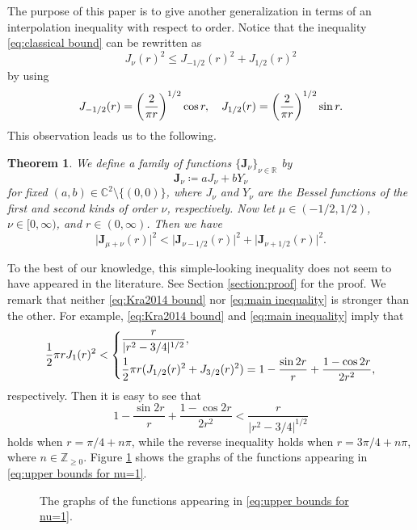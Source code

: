 \documentclass[reqno,letterpaper]{amsart}
\numberwithin{equation}{section}
\theoremstyle{plain}
\newtheorem{theorem}{Theorem}[section]
\newcommand{\R}{\mathbb{R}}
\newcommand{\C}{\mathbb{C}}
\newcommand{\Z}{\mathbb{Z}}
\newcommand{\abs}[1]{\lvert#1\rvert}
\newcommand{\BesselJ}[1]{J_{#1}}
\newcommand{\BesselY}[1]{Y_{#1}}
\newcommand{\BesselJY}[1]{\mathbf{J}_{#1}}
\newcommand{\intervaloo}[2]{(#1, #2)}
\newcommand{\intervalco}[2]{[#1, #2)}
\newcommand{\widthL}{1}
\begin{document}
	The purpose of this paper is to give another generalization in terms of an interpolation inequality with respect to order.
	Notice that the inequality \eqref{eq:classical bound} can be rewritten as
	\begin{equation} \label{eq:classical bound rewritten}
		\BesselJ{\nu}(r)^2 \leq \BesselJ{-1/2}(r)^2 + \BesselJ{1/2}(r)^2 
	\end{equation}
	by using 
	\begin{equation} \label{eq:BesselJ for nu = pm 1/2}
		\BesselJ{-1/2}(r) = \mleft( \frac{2}{\pi r} \mright)^{1/2} \cos{r} , \quad \BesselJ{1/2}(r) = \mleft( \frac{2}{\pi r} \mright)^{1/2} \sin{r} .
	\end{equation}
	This observation leads us to the following.
	\begin{theorem} \label{thm:main thm}
		We define a family of functions $\{ \BesselJY{\nu} \}_{\nu \in \R}$ by
		\begin{equation} \label{eq:BesselJY}
			\BesselJY{\nu} \coloneqq a \BesselJ{\nu} + b \BesselY{\nu}
		\end{equation}
		for fixed $(a, b) \in \C^2 \setminus \{(0, 0)\}$, where $\BesselJ{\nu}$ and $\BesselY{\nu}$ are the Bessel functions of the first and second kinds of order $\nu$, respectively.
		Now let $\mu \in \intervaloo{-\widthL/2}{\widthL/2}$, $\nu \in \intervalco{0}{\infty}$, and $r \in \intervaloo{0}{\infty}$.
		Then we have
		\begin{equation} \label{eq:main inequality}
			\abs{\BesselJY{\mu + \nu}(r)}^2 < \abs{\BesselJY{\nu-\widthL/2}(r)}^2 + \abs{\BesselJY{\nu+\widthL/2}(r)}^2 .
		\end{equation}
	\end{theorem}
	To the best of our knowledge, this simple-looking inequality does not seem to have appeared in the literature.
	See Section \ref{section:proof} for the proof.
	We remark that neither \eqref{eq:Kra2014 bound} nor \eqref{eq:main inequality} is stronger than the other.
	For example, \eqref{eq:Kra2014 bound} and \eqref{eq:main inequality} imply that
	\begin{equation} \label{eq:upper bounds for nu=1}
		\frac{1}{2} \pi r \BesselJ{1}(r)^2 
		< \begin{dcases}
			\frac{r}{\abs{r^2 - 3/4}^{1/2}} , \\
			\frac{1}{2} \pi r (\BesselJ{1/2}(r)^2 + \BesselJ{3/2}(r)^2) =  1 - \frac{\sin{2r}}{r} + \frac{1 - \cos{2r}}{2 r^2}  ,
		\end{dcases}
	\end{equation} 
	respectively. Then it is easy to see that 
	\begin{equation}
		1 - \frac{\sin{2r}}{r} + \frac{1 - \cos{2r}}{2 r^2}  < \frac{r}{\abs{r^2 - 3/4}^{1/2}}
	\end{equation}
	holds when $r = \pi/4 + n \pi$, while the reverse inequality holds when $r = 3\pi/4 + n \pi$, where $n \in \Z_{\geq 0}$. 
	Figure \ref{fig:graph} shows the graphs of the functions appearing in \eqref{eq:upper bounds for nu=1}. 
	\begin{figure}[b]
		\centering
		
		\caption{The graphs of the functions appearing in \eqref{eq:upper bounds for nu=1}.}
		\label{fig:graph}
	\end{figure}
	
\end{document}
